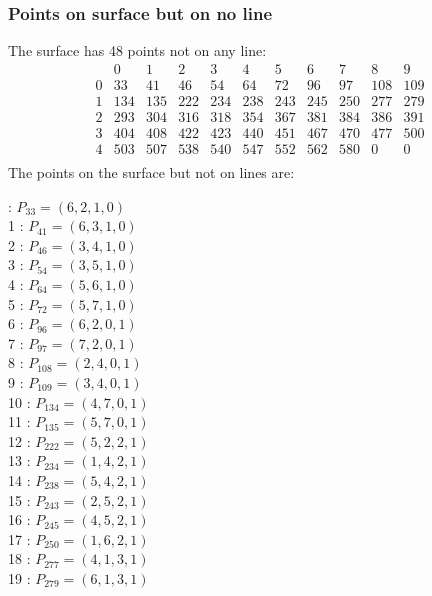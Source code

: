 \documentclass{article}
\begin{document}
{\subsubsection*{Points on surface but on no line}
The surface has 48 points not on any line:\\
$$
\begin{array}{r|*{10}{r}}
 & 0 & 1 & 2 & 3 & 4 & 5 & 6 & 7 & 8 & 9\\
\hline
0 & 33 & 41 & 46 & 54 & 64 & 72 & 96 & 97 & 108 & 109\\
1 & 134 & 135 & 222 & 234 & 238 & 243 & 245 & 250 & 277 & 279\\
2 & 293 & 304 & 316 & 318 & 354 & 367 & 381 & 384 & 386 & 391\\
3 & 404 & 408 & 422 & 423 & 440 & 451 & 467 & 470 & 477 & 500\\
4 & 503 & 507 & 538 & 540 & 547 & 552 & 562 & 580 & 0 & 0\\
\end{array}
$$
The points on the surface but not on lines are:\\
\begin{multicols}{2}
 : $P_{33}=( 6, 2, 1, 0 )$\\
1 : $P_{41}=( 6, 3, 1, 0 )$\\
2 : $P_{46}=( 3, 4, 1, 0 )$\\
3 : $P_{54}=( 3, 5, 1, 0 )$\\
4 : $P_{64}=( 5, 6, 1, 0 )$\\
5 : $P_{72}=( 5, 7, 1, 0 )$\\
6 : $P_{96}=( 6, 2, 0, 1 )$\\
7 : $P_{97}=( 7, 2, 0, 1 )$\\
8 : $P_{108}=( 2, 4, 0, 1 )$\\
9 : $P_{109}=( 3, 4, 0, 1 )$\\
10 : $P_{134}=( 4, 7, 0, 1 )$\\
11 : $P_{135}=( 5, 7, 0, 1 )$\\
12 : $P_{222}=( 5, 2, 2, 1 )$\\
13 : $P_{234}=( 1, 4, 2, 1 )$\\
14 : $P_{238}=( 5, 4, 2, 1 )$\\
15 : $P_{243}=( 2, 5, 2, 1 )$\\
16 : $P_{245}=( 4, 5, 2, 1 )$\\
17 : $P_{250}=( 1, 6, 2, 1 )$\\
18 : $P_{277}=( 4, 1, 3, 1 )$\\
19 : $P_{279}=( 6, 1, 3, 1 )$\\

\end{multicols}}
\end{document}
